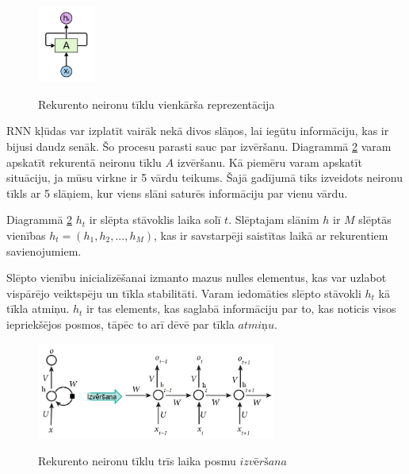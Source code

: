 \documentclass[12pt,paper=A4]{report}
\begin{document}
\begin{figure}[H] \centering
\includegraphics[width=0.17\textwidth]{recNeuNet} 
\caption{Rekurento neironu tīklu vienkārša reprezentācija} \cite{ANNTutorial} \label{rnnSimple} 
\end{figure}
   
    
RNN kļūdas var izplatīt vairāk nekā divos slāņos, lai iegūtu informāciju, kas ir bijusi daudz senāk. Šo procesu parasti sauc par izvēršanu. Diagrammā \ref{unfolding} varam apskatīt rekurentā neironu tīklu $A$ izvēršanu. Kā piemēru varam apskatīt situāciju, ja mūsu virkne ir 5 vārdu teikums. Šajā gadījumā tiks izveidots neironu tīkls ar 5 slāņiem, kur viens slāni saturēs informāciju par vienu vārdu.

 Diagrammā \ref{unfolding} $h_t$  ir slēpta stāvoklis laika solī $t$. Slēptajam slānim $h$ ir $M$ slēptās vienības $h_t = (h_1, h_2, ..., h_M)$, kas ir savstarpēji saistītas laikā ar rekurentiem savienojumiem. 
 
 Slēpto vienību inicializēšanai izmanto mazus nulles elementus, kas var uzlabot vispārējo veiktspēju un tīkla stabilitāti. Varam iedomāties slēpto stāvokli $h_t$ kā tīkla atmiņu. $h_t$ ir tas elements, kas saglabā informāciju par to, kas noticis visos iepriekšējos posmos, tāpēc to arī dēvē par tīkla $atmiņu$.
 
\begin{figure}[H] \centering
\includegraphics[width=0.70\textwidth]{rnnN} 
\caption{Rekurento neironu tīklu trīs laika posmu $izvēršana$} \cite{http://www.wildml.com/2015/09/recurrent-neural-networks-tutorial-part-1-introduction-to-rnns/} \label{unfolding} 
\end{figure}
\end{document}
